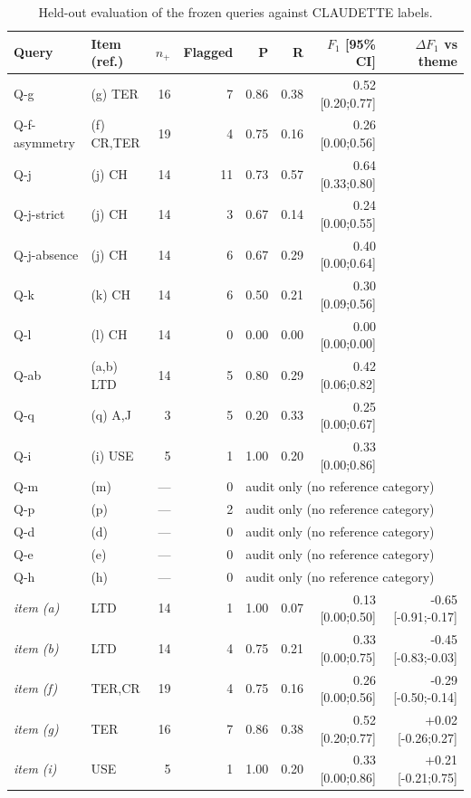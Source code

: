 \begin{table}[t]
\caption{Held-out evaluation of the frozen queries against CLAUDETTE labels.}
\label{tab:queries}
\centering
\footnotesize\setlength{\tabcolsep}{3.5pt}
\begin{tabular}{@{}llrrrrrr@{}}
\toprule
Query & Item (ref.) & $n_+$ & Flagged & P & R & $F_1$ [95\% CI] & $\Delta F_1$ vs theme \\
\midrule
Q-g & (g) TER & 16 & 7 & 0.86 & 0.38 & 0.52 [0.20;0.77] & \\
Q-f-asymmetry & (f) CR,TER & 19 & 4 & 0.75 & 0.16 & 0.26 [0.00;0.56] & \\
Q-j & (j) CH & 14 & 11 & 0.73 & 0.57 & 0.64 [0.33;0.80] & \\
Q-j-strict & (j) CH & 14 & 3 & 0.67 & 0.14 & 0.24 [0.00;0.55] & \\
Q-j-absence & (j) CH & 14 & 6 & 0.67 & 0.29 & 0.40 [0.00;0.64] & \\
Q-k & (k) CH & 14 & 6 & 0.50 & 0.21 & 0.30 [0.09;0.56] & \\
Q-l & (l) CH & 14 & 0 & 0.00 & 0.00 & 0.00 [0.00;0.00] & \\
Q-ab & (a,b) LTD & 14 & 5 & 0.80 & 0.29 & 0.42 [0.06;0.82] & \\
Q-q & (q) A,J & 3 & 5 & 0.20 & 0.33 & 0.25 [0.00;0.67] & \\
Q-i & (i) USE & 5 & 1 & 1.00 & 0.20 & 0.33 [0.00;0.86] & \\
Q-m & (m) & --- & 0 & \multicolumn{4}{l}{audit only (no reference category)} \\
Q-p & (p) & --- & 2 & \multicolumn{4}{l}{audit only (no reference category)} \\
Q-d & (d) & --- & 0 & \multicolumn{4}{l}{audit only (no reference category)} \\
Q-e & (e) & --- & 0 & \multicolumn{4}{l}{audit only (no reference category)} \\
Q-h & (h) & --- & 0 & \multicolumn{4}{l}{audit only (no reference category)} \\
\midrule
\emph{item (a)} & LTD & 14 & 1 & 1.00 & 0.07 & 0.13 [0.00;0.50] & -0.65 [-0.91;-0.17] \\
\emph{item (b)} & LTD & 14 & 4 & 0.75 & 0.21 & 0.33 [0.00;0.75] & -0.45 [-0.83;-0.03] \\
\emph{item (f)} & TER,CR & 19 & 4 & 0.75 & 0.16 & 0.26 [0.00;0.56] & -0.29 [-0.50;-0.14] \\
\emph{item (g)} & TER & 16 & 7 & 0.86 & 0.38 & 0.52 [0.20;0.77] & +0.02 [-0.26;0.27] \\
\emph{item (i)} & USE & 5 & 1 & 1.00 & 0.20 & 0.33 [0.00;0.86] & +0.21 [-0.21;0.75] \\

\end{tabular}
\end{table}
